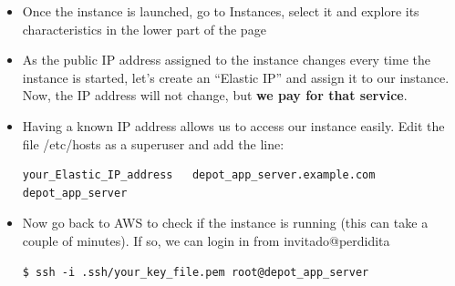 \documentclass{beamer}
\begin{document}
\begin{frame}
\begin{itemize}
\item Once the instance is launched, go to Instances, select it and explore its characteristics in the lower part of the page
\item As the public IP address assigned to the instance changes every time the instance is started, let's create an ``Elastic IP''
and assign it to our instance. Now, the IP address will not change, but \textbf{we pay for that service}.

\item Having a known IP address allows us to access our instance easily. Edit the file /etc/hosts as a superuser and add the line:
\begin{lstlisting}[escapechar=!]
your_Elastic_IP_address   depot_app_server.example.com    depot_app_server
\end{lstlisting}
\item Now go back to AWS to check if the instance is running (this can take a couple of minutes). If so, we can login in from 
invitado@perdidita

\lstset{language=shell, escapechar=!}
\begin{lstlisting}[escapechar=!]
$ ssh -i .ssh/your_key_file.pem root@depot_app_server
\end{lstlisting}

\end{itemize}

\end{frame}






\end{document}
